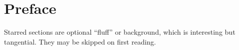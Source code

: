 \chapter*{Preface}

Starred sections are optional ``fluff'' or background, which is
interesting but tangential. They may be skipped on first reading.
